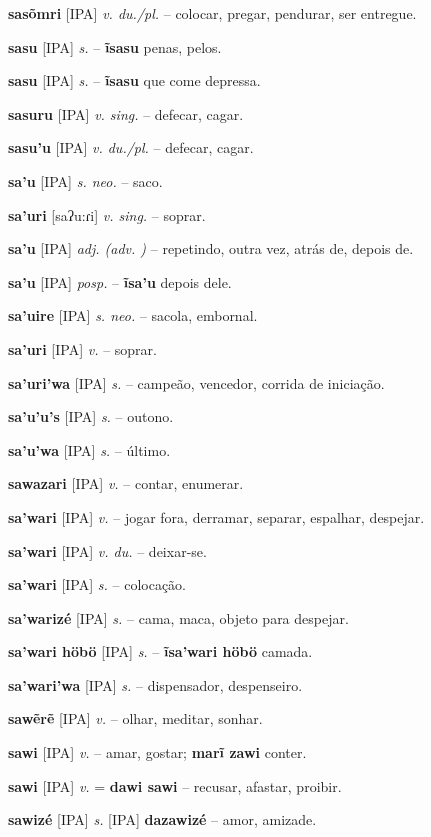 \textbf{sasõmri} [IPA] \textit{v. du./pl.} -- colocar, pregar, pendurar, ser entregue.

\textbf{sasu} [IPA] \textit{s.} -- \textbf{ĩsasu} penas, pelos.

\textbf{sasu} [IPA] \textit{s.} -- \textbf{ĩsasu} que come depressa.

\textbf{sasuru} [IPA] \textit{v. sing.} -- defecar, cagar.

\textbf{sasu'u} [IPA] \textit{v. du./pl.} -- defecar, cagar.

\textbf{sa'u} [IPA] \textit{s. neo.} -- saco.

\textbf{sa'uri} [saʔu:ɾi] \textit{v. sing.} -- soprar.

\textbf{sa'u} [IPA] \textit{adj. (adv. )} -- repetindo, outra vez, atrás de, depois de.

\textbf{sa'u} [IPA] \textit{posp.} -- \textbf{ĩsa'u} depois dele.

\textbf{sa'uire} [IPA] \textit{s. neo.} -- sacola, embornal.

\textbf{sa'uri} [IPA] \textit{v.} -- soprar.

\textbf{sa'uri'wa} [IPA] \textit{s.} -- campeão, vencedor, corrida de iniciação.

\textbf{sa'u'u's} [IPA] \textit{s.} -- outono.

\textbf{sa'u'wa} [IPA] \textit{s.} -- último.

\textbf{sawazari} [IPA] \textit{v.} -- contar, enumerar.

\textbf{sa'wari} [IPA] \textit{v.} -- jogar fora, derramar, separar, espalhar, despejar.

\textbf{sa'wari} [IPA] \textit{v. du.} -- deixar-se.

\textbf{sa'wari} [IPA] \textit{s.} -- colocação.

\textbf{sa'warizé} [IPA] \textit{s.} -- cama, maca, objeto para despejar.

\textbf{sa'wari höbö} [IPA] \textit{s.} -- \textbf{ĩsa'wari höbö} camada.

\textbf{sa'wari'wa} [IPA] \textit{s.} -- dispensador, despenseiro.

\textbf{sawẽrẽ} [IPA] \textit{v.} -- olhar, meditar, sonhar.

\textbf{sawi} [IPA] \textit{v.} -- amar, gostar; \textbf{marĩ zawi} conter.

\textbf{sawi} [IPA] \textit{v.} = \textbf{dawi sawi} -- recusar, afastar, proibir.

\textbf{sawizé} [IPA] \textit{s.} [IPA] \textbf{dazawizé} -- amor, amizade.

